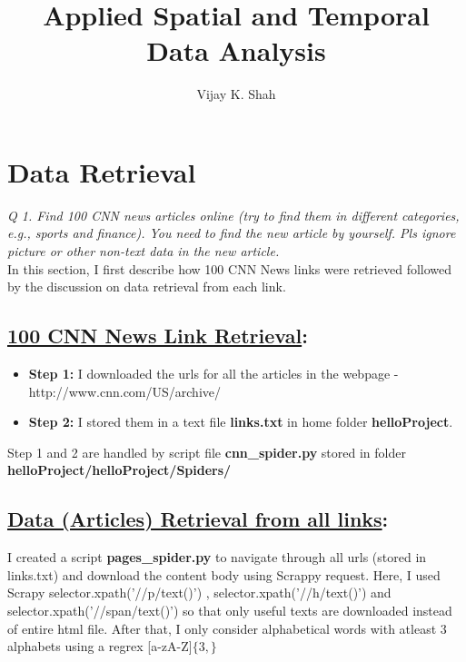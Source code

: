 \documentclass[journal,onecolumn]{IEEEtran}
\title{Applied Spatial and Temporal Data Analysis}
\author{Vijay K. Shah}
\begin{document}
\maketitle

\section{\textbf{Data Retrieval}}

\textit{Q 1. Find 100 CNN news articles online (try to find them in different categories, e.g., sports and
finance). You need to find the new article by yourself. Pls ignore picture or other non-text data
in the new article.} \\

In this section, I first describe how 100 CNN News links were retrieved followed by the discussion on data retrieval from each link.

\subsection{\underline{100 CNN News Link Retrieval}:}

\begin{itemize}[label={}]
\item \textbf{Step 1:} I downloaded the urls for all the articles in the webpage - http://www.cnn.com/US/archive/

\item \textbf{Step 2:} I stored them in a text file \textbf{links.txt} in home folder \textbf{helloProject}. 

\end{itemize}
Step 1 and 2 are handled by script file \textbf{cnn\_spider.py} stored in folder \textbf{helloProject/helloProject/Spiders/}


\subsection{\underline{Data (Articles) Retrieval from all links}:}

I created a script \textbf{pages\_spider.py} to navigate through all urls (stored in links.txt) and download the content body using Scrappy request. Here, I used Scrapy selector.xpath('//p/text()') ,  selector.xpath('//h/text()') and  selector.xpath('//span/text()') so that only useful texts are downloaded instead of entire html file. After that, I only consider alphabetical words with atleast 3 alphabets using a regrex [a-zA-Z]$\{3,\}$ \\
\end{document}
